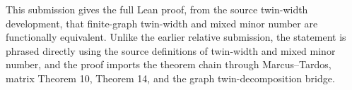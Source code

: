 This submission gives the full Lean proof, from the source twin-width development, that finite-graph twin-width and mixed minor number are functionally equivalent.  Unlike the earlier relative submission, the statement is phrased directly using the source definitions of twin-width and mixed minor number, and the proof imports the theorem chain through Marcus--Tardos, matrix Theorem 10, Theorem 14, and the graph twin-decomposition bridge.
